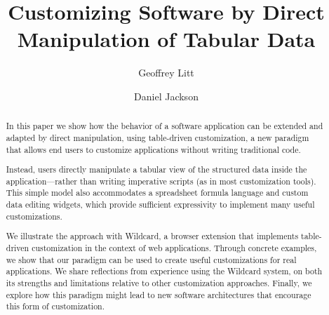 \documentclass[sigplan,10pt,anonymous,review]{acmart}
\begin{document}
\title{Customizing Software by Direct Manipulation of Tabular Data}


\author{Geoffrey Litt}

\author{Daniel Jackson}


\begin{abstract}
  In this paper we show how the behavior of a software application can
  be extended and adapted by direct manipulation, using table-driven
  customization, a new paradigm that allows end users to customize
  applications without writing traditional code.

  Instead, users directly manipulate a tabular view of the structured
  data inside the application---rather than writing imperative scripts
  (as in most customization tools). This simple model also accommodates
  a spreadsheet formula language and custom data editing widgets, which
  provide sufficient expressivity to implement many useful
  customizations.

  We illustrate the approach with Wildcard, a browser extension that
  implements table-driven customization in the context of web
  applications. Through concrete examples, we show that our paradigm can
  be used to create useful customizations for real applications. We
  share reflections from experience using the Wildcard system, on both
  its strengths and limitations relative to other customization
  approaches. Finally, we explore how this paradigm might lead to new
  software architectures that encourage this form of customization.
\end{abstract}
\end{document}
